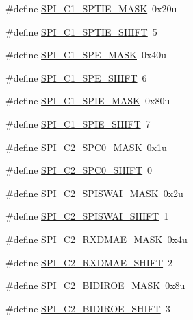 \begin{DoxyCompactItemize}
\#define \hyperlink{group___s_p_i___register___masks_ga9a819839ef92c4a16fcbe0403dada66a}{S\+P\+I\+\_\+\+C1\+\_\+\+S\+P\+T\+I\+E\+\_\+\+M\+A\+SK}~0x20u
\item 
\#define \hyperlink{group___s_p_i___register___masks_gae79e5ea53e13f0697322235e9bb3e005}{S\+P\+I\+\_\+\+C1\+\_\+\+S\+P\+T\+I\+E\+\_\+\+S\+H\+I\+FT}~5
\item 
\#define \hyperlink{group___s_p_i___register___masks_gabbe954288bbd6dcd564064de90d1b414}{S\+P\+I\+\_\+\+C1\+\_\+\+S\+P\+E\+\_\+\+M\+A\+SK}~0x40u
\item 
\#define \hyperlink{group___s_p_i___register___masks_ga21a79703e2147332b7234f62615c2c77}{S\+P\+I\+\_\+\+C1\+\_\+\+S\+P\+E\+\_\+\+S\+H\+I\+FT}~6
\item 
\#define \hyperlink{group___s_p_i___register___masks_gaaa0dbb3306041f89299298e64d7b7a58}{S\+P\+I\+\_\+\+C1\+\_\+\+S\+P\+I\+E\+\_\+\+M\+A\+SK}~0x80u
\item 
\#define \hyperlink{group___s_p_i___register___masks_gacd5c8f15ee05357d76591989eb035d19}{S\+P\+I\+\_\+\+C1\+\_\+\+S\+P\+I\+E\+\_\+\+S\+H\+I\+FT}~7
\item 
\#define \hyperlink{group___s_p_i___register___masks_gaaaeac694d1d42228524e96040a9ddf53}{S\+P\+I\+\_\+\+C2\+\_\+\+S\+P\+C0\+\_\+\+M\+A\+SK}~0x1u
\item 
\#define \hyperlink{group___s_p_i___register___masks_gabd2530719a946cda56c285547a8239ee}{S\+P\+I\+\_\+\+C2\+\_\+\+S\+P\+C0\+\_\+\+S\+H\+I\+FT}~0
\item 
\#define \hyperlink{group___s_p_i___register___masks_ga05643847feabba49c1e7e16044278d08}{S\+P\+I\+\_\+\+C2\+\_\+\+S\+P\+I\+S\+W\+A\+I\+\_\+\+M\+A\+SK}~0x2u
\item 
\#define \hyperlink{group___s_p_i___register___masks_gae756e76f39bea0b21aac347ba75fd16c}{S\+P\+I\+\_\+\+C2\+\_\+\+S\+P\+I\+S\+W\+A\+I\+\_\+\+S\+H\+I\+FT}~1
\item 
\#define \hyperlink{group___s_p_i___register___masks_gab50dca40cbee0b9359dd2f27fa0920da}{S\+P\+I\+\_\+\+C2\+\_\+\+R\+X\+D\+M\+A\+E\+\_\+\+M\+A\+SK}~0x4u
\item 
\#define \hyperlink{group___s_p_i___register___masks_ga5460ff43cfcee3211e76bb6ef2321563}{S\+P\+I\+\_\+\+C2\+\_\+\+R\+X\+D\+M\+A\+E\+\_\+\+S\+H\+I\+FT}~2
\item 
\#define \hyperlink{group___s_p_i___register___masks_gab4fb07392c6e708f3950587b02109f2f}{S\+P\+I\+\_\+\+C2\+\_\+\+B\+I\+D\+I\+R\+O\+E\+\_\+\+M\+A\+SK}~0x8u
\item 
\#define \hyperlink{group___s_p_i___register___masks_ga228238321389e2344fa3c837fe55492e}{S\+P\+I\+\_\+\+C2\+\_\+\+B\+I\+D\+I\+R\+O\+E\+\_\+\+S\+H\+I\+FT}~3

\end{DoxyCompactItemize}
